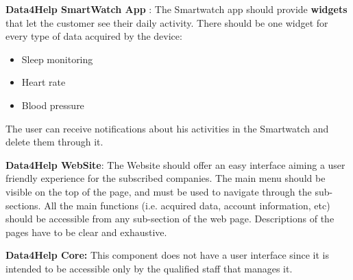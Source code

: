 \textbf{Data4Help SmartWatch App} :
The Smartwatch app should provide \textbf{widgets} that let the customer see their daily activity.
There should be one widget for every type of data acquired by the device:
\begin{itemize}
    \item Sleep monitoring 
    \item Heart rate
    \item Blood pressure
\end{itemize}
The user can receive notifications about his activities in the Smartwatch and delete them through it.
\newline

\textbf{Data4Help WebSite}: The Website should offer an easy interface aiming a user friendly experience for the subscribed companies. The main menu should be visible on the top of the page, and must be used to navigate through the sub-sections. All the main functions (i.e. acquired data, account information, etc) should be accessible from any sub-section of the web page. 
Descriptions of the pages have to be clear and exhaustive.
\newline

\textbf{Data4Help Core:} This component does not have a user interface since it is intended to be accessible only by the qualified staff that manages it. 